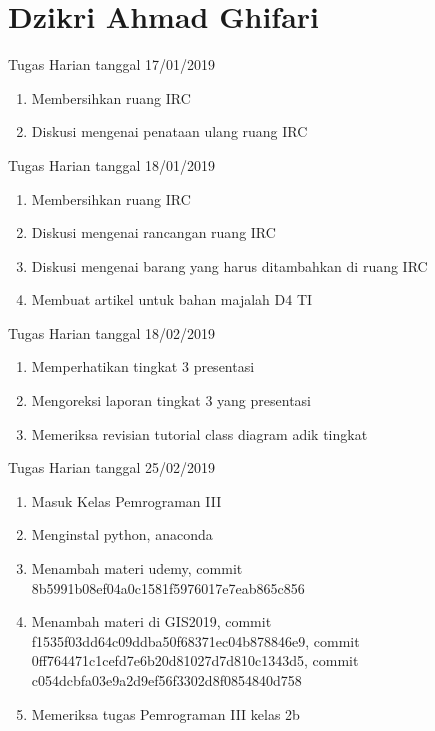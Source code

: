 \chapter{Dzikri Ahmad Ghifari}

Tugas Harian tanggal 17/01/2019
\begin{enumerate}
\item Membersihkan ruang IRC
\item Diskusi mengenai penataan ulang ruang IRC
\end{enumerate}

Tugas Harian tanggal 18/01/2019
\begin{enumerate}
\item Membersihkan ruang IRC
\item Diskusi mengenai rancangan ruang IRC
\item Diskusi mengenai barang yang harus ditambahkan di ruang IRC
\item Membuat artikel untuk bahan majalah D4 TI
\end{enumerate}

Tugas Harian tanggal 18/02/2019
\begin{enumerate}
\item Memperhatikan tingkat 3 presentasi
\item Mengoreksi laporan tingkat 3 yang presentasi
\item Memeriksa revisian tutorial class diagram adik tingkat
\end{enumerate}

Tugas Harian tanggal 25/02/2019
\begin{enumerate}
\item Masuk Kelas Pemrograman III
\item Menginstal python, anaconda
\item Menambah materi udemy, commit 8b5991b08ef04a0c1581f5976017e7eab865c856
\item Menambah materi di GIS2019, commit f1535f03dd64c09ddba50f68371ec04b878846e9, commit 0ff764471c1cefd7e6b20d81027d7d810c1343d5, commit c054dcbfa03e9a2d9ef56f3302d8f0854840d758
\item Memeriksa tugas Pemrograman III kelas 2b 
\end{enumerate}




